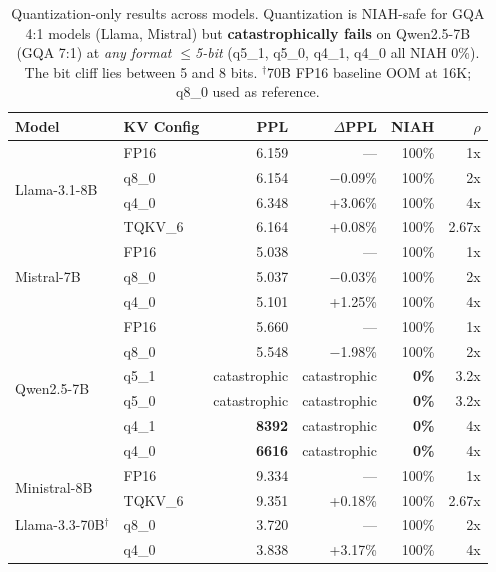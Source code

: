 \begin{table}[h]
\centering
\small
\begin{tabular}{llrrrr}
\toprule
\textbf{Model} & \textbf{KV Config} & \textbf{PPL} & \textbf{$\Delta$PPL} & \textbf{NIAH} & \textbf{$\rho$} \\
\midrule
\multirow{4}{*}{Llama-3.1-8B}
 & FP16       & 6.159  & ---       & 100\% & 1x \\
 & q8\_0      & 6.154  & $-$0.09\% & 100\% & 2x \\
 & q4\_0      & 6.348  & +3.06\%   & 100\% & 4x \\
 & TQKV\_6    & 6.164  & +0.08\%   & 100\% & 2.67x \\
\midrule
\multirow{3}{*}{Mistral-7B}
 & FP16       & 5.038  & ---       & 100\% & 1x \\
 & q8\_0      & 5.037  & $-$0.03\% & 100\% & 2x \\
 & q4\_0      & 5.101  & +1.25\%   & 100\% & 4x \\
\midrule
\multirow{6}{*}{Qwen2.5-7B}
 & FP16       & 5.660  & ---       & 100\% & 1x \\
 & q8\_0      & 5.548  & $-$1.98\% & 100\% & 2x \\
 & q5\_1      & catastrophic & catastrophic & \textbf{0\%} & 3.2x \\
 & q5\_0      & catastrophic & catastrophic & \textbf{0\%} & 3.2x \\
 & q4\_1      & \textbf{8392}  & catastrophic & \textbf{0\%} & 4x \\
 & q4\_0      & \textbf{6616}  & catastrophic & \textbf{0\%} & 4x \\
\midrule
\multirow{2}{*}{Ministral-8B}
 & FP16       & 9.334  & ---       & 100\% & 1x \\
 & TQKV\_6    & 9.351  & +0.18\%   & 100\% & 2.67x \\
\midrule
Llama-3.3-70B$^\dagger$ & q8\_0 & 3.720  & ---       & 100\% & 2x \\
              & q4\_0  & 3.838  & +3.17\%   & 100\% & 4x \\
\bottomrule
\end{tabular}
\caption{Quantization-only results across models. Quantization is NIAH-safe for GQA 4:1 models (Llama, Mistral) but \textbf{catastrophically fails} on Qwen2.5-7B (GQA 7:1) at \emph{any format $\leq$5-bit} (q5\_1, q5\_0, q4\_1, q4\_0 all NIAH 0\%). The bit cliff lies between 5 and 8 bits. $^\dagger$70B FP16 baseline OOM at 16K; q8\_0 used as reference.}
\label{tab:quant-baseline}
\end{table}

